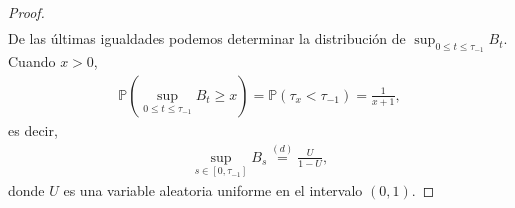 \begin{proof}
\begin{align*}
\end{align*}
De las últimas igualdades podemos determinar la distribución de $\sup_{0 \leq t \leq \tau_{-1}} B_t$. Cuando $x > 0$, 
\begin{align*}
\mathbb{P} \left( \sup_{0 \leq t \leq \tau_{-1}} B_t \geq x \right) = \mathbb{P} \left( \tau_x < \tau_{-1} \right) = \frac{1}{x+1},
\end{align*}
es decir, 
\begin{align*}
\sup_{s \in [0, \tau_{-1}]} B_s \stackrel{(d)}{=} \frac{U}{1 - U},
\end{align*}
donde $U$ es una variable aleatoria uniforme en el intervalo $(0, 1)$.
\end{proof}




























